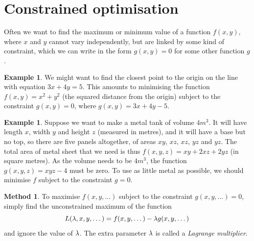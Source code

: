 \documentclass[reqno]{amsart}
\theoremstyle{definition}
\newtheorem{example}[theorem]{Example}
\newtheorem{method}[theorem]{Method}
\begin{document}
\section{Constrained optimisation}
\label{sec-constrained}

Often we want to find the maximum or minimum value of a function
$f(x,y)$, where $x$ and $y$ cannot vary independently, but are linked
by some kind of constraint, which we can write in the form $g(x,y)=0$
for some other function $g$.

\begin{example}\label{eg-closest}
 We might want to find the closest point to the origin on the line
 with equation $3x+4y=5$.  This amounts to minimising the function
 $f(x,y)=x^2+y^2$ (the squared distance from the origin) subject to
 the constraint $g(x,y)=0$, where $g(x,y)=3x+4y-5$.
\end{example}
\begin{example}\label{eg-tank}
 Suppose we want to make a metal tank of volume $4m^3$.  It will have
 length $x$, width $y$ and height $z$ (measured in metres), and it
 will have a base but no top, so there are five panels altogether, of
 areas $xy$, $xz$, $xz$, $yz$ and $yz$.  The total area of metal sheet
 that we need is thus $f(x,y,z)=xy+2xz+2yz$ (in square metres).  As
 the volume needs to be $4m^3$, the function $g(x,y,z)=xyz-4$ must be
 zero.  To use as little metal as possible, we should minimise $f$
 subject to the constraint $g=0$.
\end{example}

\begin{method}\label{meth-lagrange-mult}
 To maximise $f(x,y,\dotsc)$ subject to the constraint
 $g(x,y,\dotsc)=0$, simply find the unconstrained maximum of the
 function 
 \[ L(\lambda,x,y,\dotsc) = f(x,y,\dotsc) - \lambda g(x,y,\dotsc) \]
 and ignore the value of $\lambda$.  The extra parameter $\lambda$ is called a
 \emph{Lagrange multiplier}.
\end{method}
\end{document}
